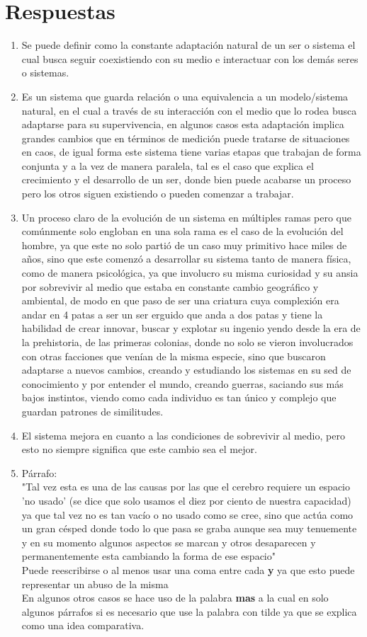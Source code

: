 \documentclass[12pt]{article}
\begin{document}
\section{Respuestas}
\begin{enumerate}
  \item Se puede definir como la constante adaptación natural de un ser o sistema el cual busca seguir coexistiendo con su medio e interactuar con los demás seres o sistemas.
  \item Es un sistema que guarda relación o una equivalencia a un modelo/sistema natural, en el cual a través de su interacción con el medio que lo rodea busca adaptarse para su supervivencia, en algunos casos esta adaptación implica grandes cambios que en términos de medición puede tratarse de situaciones en caos, de igual forma este sistema tiene varias etapas que trabajan de forma conjunta y a la vez de manera paralela, tal es el caso que explica el crecimiento y el desarrollo de un ser, donde bien puede acabarse un proceso pero los otros siguen existiendo o pueden comenzar a trabajar.
  \item Un proceso claro de la evolución de un sistema en múltiples ramas pero que comúnmente solo engloban en una sola rama es el caso de la evolución del hombre, ya que este no solo partió de un caso muy primitivo hace miles de años, sino que este comenzó a desarrollar su sistema tanto de manera física, como de manera psicológica, ya que involucro su misma curiosidad y su ansia por sobrevivir al medio que estaba en constante cambio geográfico y ambiental, de modo en que paso de ser una criatura cuya complexión era andar en 4 patas a ser un ser erguido que anda a dos patas y tiene la habilidad de crear innovar, buscar y explotar su ingenio yendo desde la era de la prehistoria, de las primeras colonias, donde no solo se vieron involucrados con otras facciones que venían de la misma especie, sino que buscaron adaptarse a nuevos cambios, creando y estudiando los sistemas en su sed de conocimiento y por entender el mundo, creando guerras, saciando sus más bajos instintos, viendo como cada individuo es tan único y complejo que guardan patrones de similitudes.
  \item El sistema mejora en cuanto a las condiciones de sobrevivir al medio, pero esto no siempre significa que este cambio sea el mejor.
  \item Párrafo:\\
    "Tal vez esta es una de las causas por las que el cerebro requiere un espacio 'no usado' (se dice que solo usamos el diez por ciento de nuestra capacidad) ya que tal vez no es tan vacío o no usado como se cree, sino que actúa como un gran césped donde todo lo que pasa se graba aunque sea muy tenuemente y en su momento algunos aspectos se marcan y otros desaparecen y permanentemente esta cambiando la forma de ese espacio"
    \\Puede reescribirse o al menos usar una coma entre cada \textbf{y} ya que esto puede representar un abuso de la misma
    \\
    En algunos otros casos se hace uso de la palabra \textbf{mas} a la cual en solo algunos párrafos si es necesario que use la palabra con tilde ya que se explica como una idea comparativa.
\end{enumerate}
\end{document}
